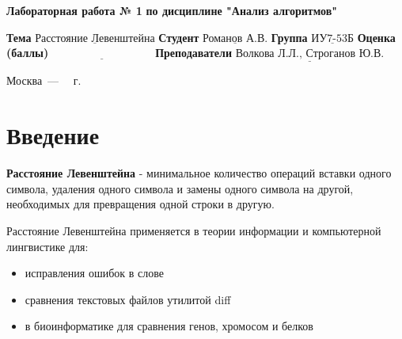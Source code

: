 \documentclass[12pt]{report}
\begin{document}
\begin{titlepage}
	
	\begin{center}
		\noindent\begin{minipage}{1.3\textwidth}\centering
			\Large\textbf{  Лабораторная работа № 1}\newline
			\textbf{по дисциплине "Анализ алгоритмов"}\newline\newline
		\end{minipage}
	\end{center}
	
	\noindent\textbf{Тема} $\underline{\text{Расстояние Левенштейна}}$\newline\newline
	\noindent\textbf{Студент} $\underline{\text{Романов А.В.}}$\newline\newline
	\noindent\textbf{Группа} $\underline{\text{ИУ7-53Б}}$\newline\newline
	\noindent\textbf{Оценка (баллы)} $\underline{\text{~~~~~~~~~~~~~~~~~~~~~~~~~~~}}$\newline\newline
	\noindent\textbf{Преподаватели} $\underline{\text{Волкова Л.Л., Строганов Ю.В.}}$\newline\newline\newline
	
	\begin{center}
		\vfill
		Москва~---~\the\year
		~г.
	\end{center}
\end{titlepage}


\tableofcontents

\newpage
\chapter*{Введение}
\textbf{Расстояние Левенштейна} - минимальное количество операций вставки одного символа, удаления одного символа и замены одного символа на другой, необходимых для превращения одной строки в другую.
\newline

Расстояние Левенштейна применяется в теории информации и компьютерной лингвистике для:

\begin{itemize}
	\item исправления ошибок в слове
	\item сравнения текстовых файлов утилитой diff
	\item в биоинформатике для сравнения генов, хромосом и белков
\end{itemize}
\end{document}

